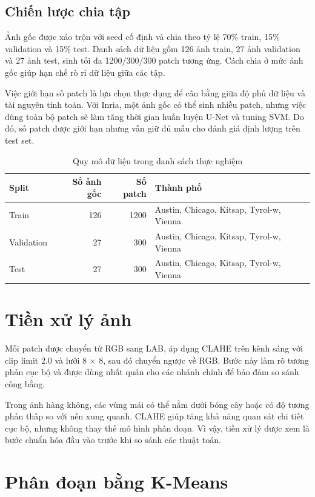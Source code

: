 \documentclass[12pt,a4paper]{report}
\begin{document}
\subsection{Chiến lược chia tập}

Ảnh gốc được xáo trộn với seed cố định và chia theo tỷ lệ 70\% train, 15\% validation và 15\% test. Danh sách dữ liệu gồm 126 ảnh train, 27 ảnh validation và 27 ảnh test, sinh tối đa 1200/300/300 patch tương ứng. Cách chia ở mức ảnh gốc giúp hạn chế rò rỉ dữ liệu giữa các tập.

Việc giới hạn số patch là lựa chọn thực dụng để cân bằng giữa độ phủ dữ liệu và tài nguyên tính toán. Với Inria, một ảnh gốc có thể sinh nhiều patch, nhưng việc dùng toàn bộ patch sẽ làm tăng thời gian huấn luyện U-Net và tuning SVM. Do đó, số patch được giới hạn nhưng vẫn giữ đủ mẫu cho đánh giá định lượng trên test set.

\begin{table}[htbp]
\centering
\caption{Quy mô dữ liệu trong danh sách thực nghiệm}
\label{tab:data-split}
\begin{tabular}{|l|r|r|p{6.8cm}|}
\hline
\textbf{Split} & \textbf{Số ảnh gốc} & \textbf{Số patch} & \textbf{Thành phố}\\
\hline
Train & 126 & 1200 & Austin, Chicago, Kitsap, Tyrol-w, Vienna\\
\hline
Validation & 27 & 300 & Austin, Chicago, Kitsap, Tyrol-w, Vienna\\
\hline
Test & 27 & 300 & Austin, Chicago, Kitsap, Tyrol-w, Vienna\\
\hline
\end{tabular}
\end{table}

\section{Tiền xử lý ảnh}

Mỗi patch được chuyển từ RGB sang LAB, áp dụng CLAHE trên kênh sáng với clip limit 2.0 và lưới 8 $\times$ 8, sau đó chuyển ngược về RGB. Bước này làm rõ tương phản cục bộ và được dùng nhất quán cho các nhánh chính để bảo đảm so sánh công bằng.

Trong ảnh hàng không, các vùng mái có thể nằm dưới bóng cây hoặc có độ tương phản thấp so với nền xung quanh. CLAHE giúp tăng khả năng quan sát chi tiết cục bộ, nhưng không thay thế mô hình phân đoạn. Vì vậy, tiền xử lý được xem là bước chuẩn hóa đầu vào trước khi so sánh các thuật toán.

\section{Phân đoạn bằng K-Means}
\end{document}
